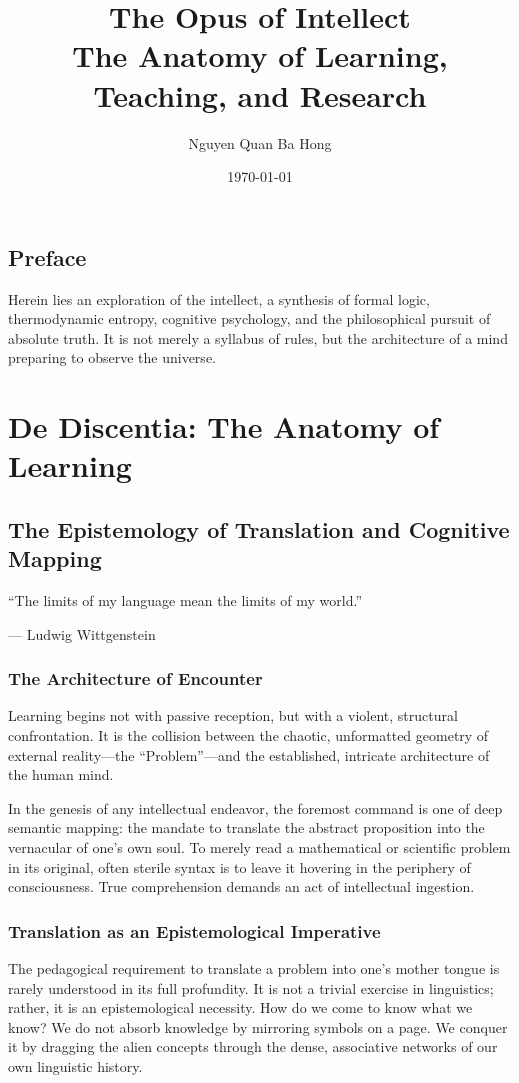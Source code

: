 \documentclass[11pt,a4paper,oneside]{book}
\title{\Huge\bfseries The Opus of Intellect\\ \vspace{0.5em} \Large The Anatomy of Learning, Teaching, and Research}
\author{\Large Nguyen Quan Ba Hong}
\date{\vspace{1em}\today}
\theoremstyle{definition}
\theoremstyle{remark}
\begin{document}
\frontmatter
\maketitle

\chapter*{Preface}
Herein lies an exploration of the intellect, a synthesis of formal logic, thermodynamic entropy, cognitive psychology, and the philosophical pursuit of absolute truth. It is not merely a syllabus of rules, but the architecture of a mind preparing to observe the universe.

\tableofcontents

\mainmatter

\part{De Discentia: The Anatomy of Learning}

\chapter{The Epistemology of Translation and Cognitive Mapping}
\epigraph{``The limits of my language mean the limits of my world.''}{--- Ludwig Wittgenstein}

\section{The Architecture of Encounter}
Learning begins not with passive reception, but with a violent, structural confrontation. It is the collision between the chaotic, unformatted geometry of external reality---the ``Problem''---and the established, intricate architecture of the human mind. 

In the genesis of any intellectual endeavor, the foremost command is one of deep semantic mapping: the mandate to translate the abstract proposition into the vernacular of one's own soul. To merely read a mathematical or scientific problem in its original, often sterile syntax is to leave it hovering in the periphery of consciousness. True comprehension demands an act of intellectual ingestion.

\section{Translation as an Epistemological Imperative}
The pedagogical requirement to translate a problem into one's mother tongue is rarely understood in its full profundity. It is not a trivial exercise in linguistics; rather, it is an epistemological necessity. How do we come to know what we know? We do not absorb knowledge by mirroring symbols on a page. We conquer it by dragging the alien concepts through the dense, associative networks of our own linguistic history.
\end{document}
